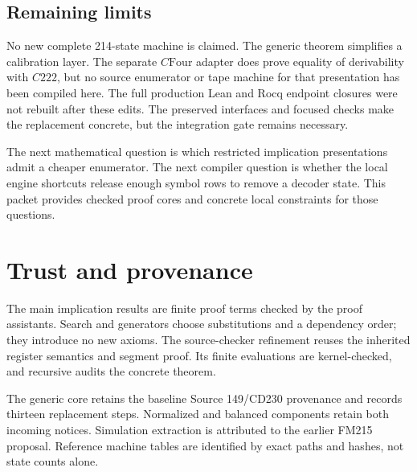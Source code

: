\documentclass[11pt]{article}
\theoremstyle{definition}\newtheorem{definition}[theorem]{Definition}
\newcommand{\code}[1]{\texttt{\detokenize{#1}}}
\begin{document}
\subsection{Remaining limits}
No new complete 214-state machine is claimed. The generic theorem simplifies a calibration layer. The separate $C\mathrm{Four}$ adapter does prove equality of derivability with $C222$, but no source enumerator or tape machine for that presentation has been compiled here. The full production Lean and Rocq endpoint closures were not rebuilt after these edits. The preserved interfaces and focused checks make the replacement concrete, but the integration gate remains necessary.

The next mathematical question is which restricted implication presentations admit a cheaper enumerator. The next compiler question is whether the local engine shortcuts release enough symbol rows to remove a decoder state. This packet provides checked proof cores and concrete local constraints for those questions.

\clearpage
\appendix
\section{Trust and provenance}
The main implication results are finite proof terms checked by the proof assistants. Search and generators choose substitutions and a dependency order; they introduce no new axioms. The source-checker refinement reuses the inherited register semantics and segment proof. Its finite evaluations are kernel-checked, and recursive \code{coqchk} audits the concrete theorem.

The generic core retains the baseline Source 149/CD230 provenance and records thirteen replacement steps. Normalized and balanced components retain both incoming notices. Simulation extraction is attributed to the earlier FM215 proposal. Reference machine tables are identified by exact paths and hashes, not state counts alone.
\end{document}
